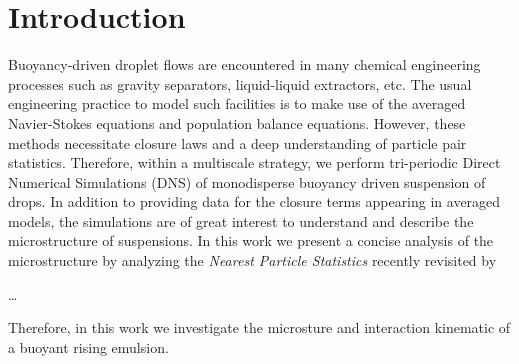 \section{Introduction}


Buoyancy-driven droplet flows are encountered in many chemical engineering processes such as gravity separators, liquid-liquid extractors, etc. The usual engineering practice to model such facilities is to make use of the averaged Navier-Stokes equations and population balance equations. 
However, these methods necessitate closure laws and a deep understanding of particle pair statistics.
Therefore, within a multiscale strategy, we perform tri-periodic Direct Numerical Simulations (DNS) of monodisperse buoyancy driven suspension of drops.
In addition to providing data for the closure terms appearing in averaged models, the simulations are of great interest to understand and describe the microstructure of suspensions. 
In this work we present a concise analysis of the microstructure by analyzing the \textit{Nearest Particle Statistics} recently revisited by \citet{zhang2021ensemble}



\ldots

Therefore, in this work we investigate the microsture and interaction kinematic of a buoyant rising emulsion. 
